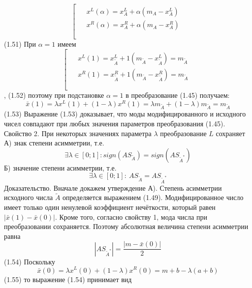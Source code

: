 	\[\left[ \begin{matrix}
   \begin{aligned}
  & {{x}^{L}}(\alpha )=x_{A}^{L}+\alpha ({{m}_{A}}-x_{A}^{L}) \\ 
 & {{x}^{R}}(\alpha )=x_{A}^{R}+\alpha ({{m}_{A}}-x_{A}^{R}) \\ 
\end{aligned}  \\
\end{matrix} \right.\] 	(1.51)
При $\alpha =1$ имеем
	\[\left[ \begin{matrix}
   \begin{aligned}
  & {{x}^{L}}(1)=x_{{\tilde{A}}}^{L}+1\left( {{m}_{{\tilde{A}}}}-x_{{\tilde{A}}}^{L} \right)={{m}_{{\tilde{A}}}} \\ 
 & {{x}^{R}}(1)=x_{{\tilde{A}}}^{R}+1\left( {{m}_{{\tilde{A}}}}-x_{{\tilde{A}}}^{R} \right)={{m}_{{\tilde{A}}}} \\ 
\end{aligned}  \\
\end{matrix} \right.\],	(1.52)
поэтому при подстановке $\alpha =1$ в преобразование (1.45) получаем:
	\[\bar{x}\left( 1 \right)=\lambda {{x}^{L}}\left( 1 \right)+\left( 1-\lambda  \right){{x}^{R}}\left( 1 \right)=\lambda {{m}_{{\tilde{A}}}}+\left( 1-\lambda  \right){{m}_{{\tilde{A}}}}={{m}_{{\tilde{A}}}}\] 	(1.53)
Выражение (1.53) доказывает, что моды модифицированного и исходного чисел совпадают при любых значения параметров преобразования (1.45).
Свойство 2. При некоторых значениях параметра $\lambda $ преобразование $L$ сохраняет
А) знак степени асимметрии, т.е. \[\exists \lambda \in [0;1]:sign(A{{S}_{{\tilde{A}}}})=sign(A{{S}_{{{{\tilde{A}}}^{*}}}})\] 
Б) значение степени асимметрии, т.е. \[\exists \lambda \in [0;1]:\ A{{S}_{{\tilde{A}}}}=A{{S}_{{{{\tilde{A}}}^{*}}}}\] 
Доказательство. Вначале докажем утверждение А). Степень асимметрии исходного числа $\tilde{A}$ определяется выражением (1.49). Модифицированное число имеет только один ненулевой коэффициент нечёткости, который равен $\left| \bar{x}\left( 1 \right)-\bar{x}\left( 0 \right) \right|$. Кроме того, согласно свойству 1, мода числа при преобразовании сохраняется. Поэтому абсолютная величина степени асимметрии равна
	\[\left| A{{S}_{{{{\tilde{A}}}^{*}}}} \right|=\frac{\left| m-\bar{x}\left( 0 \right) \right|}{2}\] 	(1.54)
Поскольку
	\[\bar{x}\left( 0 \right)=\lambda {{x}^{L}}\left( 0 \right)+\left( 1-\lambda  \right){{x}^{R}}\left( 0 \right)=m+b-\lambda \left( a+b \right)\] 	(1.55)
то выражение (1.54) принимает вид

